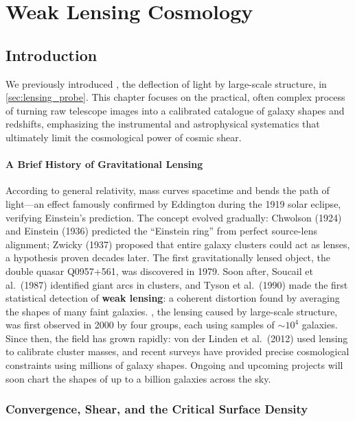 \chapter{Weak Lensing Cosmology} \label{ch:weak_lensing}

\section{Introduction} \label{sec:wl_intro}

We previously introduced , the deflection of light by large-scale structure, in \cref{sec:lensing_probe}. This chapter focuses on the practical, often complex process of turning raw telescope images into a calibrated catalogue of galaxy shapes and redshifts, emphasizing the instrumental and astrophysical systematics that ultimately limit the cosmological power of cosmic shear.

\subsubsection{A Brief History of Gravitational Lensing} \label{subsec:wl_history}

According to general relativity, mass curves spacetime and bends the path of light—an effect famously confirmed by Eddington during the 1919 solar eclipse, verifying Einstein's prediction. The concept evolved gradually: Chwolson (1924) and Einstein (1936) predicted the “Einstein ring” from perfect source-lens alignment; Zwicky (1937) proposed that entire galaxy clusters could act as lenses, a hypothesis proven decades later. The first gravitationally lensed object, the double quasar Q0957+561, was discovered in 1979. Soon after, Soucail et al.\ (1987) identified giant arcs in clusters, and Tyson et al.\ (1990) made the first statistical detection of \textbf{weak lensing}: a coherent distortion found by averaging the shapes of many faint galaxies. , the lensing caused by large-scale structure, was first observed in 2000 by four groups, each using samples of $\sim 10^4$ galaxies. Since then, the field has grown rapidly: von der Linden et al.\ (2012) used lensing to calibrate cluster masses, and recent surveys have provided precise cosmological constraints using millions of galaxy shapes. Ongoing and upcoming projects will soon chart the shapes of up to a billion galaxies across the sky.

\subsection{Convergence, Shear, and the Critical Surface Density} \label{sec:wl_formalism}

